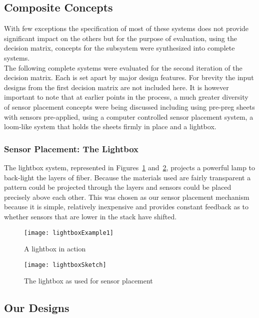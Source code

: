 \documentclass[12pt,letterpaper,notitlepage]{article}
\begin{document}
\subsection{Composite Concepts}
With few exceptions the specification of most of these systems does not provide significant impact on the others but for the purpose of evaluation, using the decision matrix, concepts for the subsystem were synthesized into complete systems.\\

The following complete systems were evaluated for the second iteration of the decision matrix. Each is set apart by major design features. For brevity the input designs from the first decision matrix are not included here. It is however important to note that at earlier points in the process, a much greater diversity of sensor placement concepts were being discussed including using pre-preg sheets with sensors pre-applied, using a computer controlled sensor placement system, a loom-like system that holds the sheets firmly in place and a lightbox.\\

\subsubsection{Sensor Placement: The Lightbox}
The lightbox system, represented in Figures~\ref{fig:lightboxExample1} and~\ref{fig:lightboxSketch}, projects a powerful lamp to back-light the layers of fiber. Because the materials used are fairly transparent a pattern could be projected through the layers and sensors could be placed precisely above each other. This was chosen as our sensor placement mechanism because it is simple, relatively inexpensive and provides constant feedback as to whether sensors that are lower in the stack have shifted.
\begin{figure}[htbp]
\centering
\texttt{[image: lightboxExample1]}
\caption{A lightbox in action}
\label{fig:lightboxExample1}
\end{figure}
\begin{figure}[p]
\centering
\texttt{[image: lightboxSketch]}
\caption{The lightbox as used for sensor placement}
\label{fig:lightboxSketch}
\end{figure}
\subsection{Our Designs}
\end{document}
